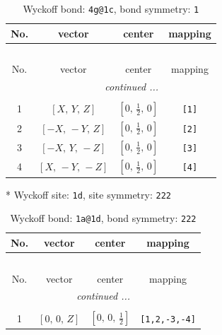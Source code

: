 \documentclass[fleqn,8pt]{jsarticle}
\begin{document}
\begin{longtable}{cccc}
\caption{Wyckoff bond: {\tt 4g@1c}, bond symmetry: {\tt 1}}
 \\
 \hline \hline
No. & vector & center & mapping \\ \hline \endfirsthead

\multicolumn{3}{l}{\tablename\ \thetable{}} \\
 \hline \hline
No. & vector & center & mapping \\ \hline \endhead

 \hline \hline
\multicolumn{3}{r}{\footnotesize\it continued ...} \\ \endfoot

 \hline \hline
\multicolumn{3}{r}{} \\ \endlastfoot

1 & $\left[ X,\, Y,\, Z \right]$ & $\left[ 0,\, \frac{1}{2},\, 0 \right]$ & {\tt [1]} \\ \hline
2 & $\left[ - X,\, - Y,\, Z \right]$ & $\left[ 0,\, \frac{1}{2},\, 0 \right]$ & {\tt [2]} \\ \hline
3 & $\left[ - X,\, Y,\, - Z \right]$ & $\left[ 0,\, \frac{1}{2},\, 0 \right]$ & {\tt [3]} \\ \hline
4 & $\left[ X,\, - Y,\, - Z \right]$ & $\left[ 0,\, \frac{1}{2},\, 0 \right]$ & {\tt [4]} \\
\end{longtable}
* Wyckoff site: {\tt 1d}, site symmetry: {\tt 222}
\renewcommand{\arraystretch}{1.2}
\begin{longtable}{cccc}
\caption{Wyckoff bond: {\tt 1a@1d}, bond symmetry: {\tt 222}}
 \\
 \hline \hline
No. & vector & center & mapping \\ \hline \endfirsthead

\multicolumn{3}{l}{\tablename\ \thetable{}} \\
 \hline \hline
No. & vector & center & mapping \\ \hline \endhead

 \hline \hline
\multicolumn{3}{r}{\footnotesize\it continued ...} \\ \endfoot

 \hline \hline
\multicolumn{3}{r}{} \\ \endlastfoot

1 & $\left[ 0,\, 0,\, Z \right]$ & $\left[ 0,\, 0,\, \frac{1}{2} \right]$ & {\tt [1,2,-3,-4]} \\
\end{longtable}
\renewcommand{\arraystretch}{1.2}
\end{document}
